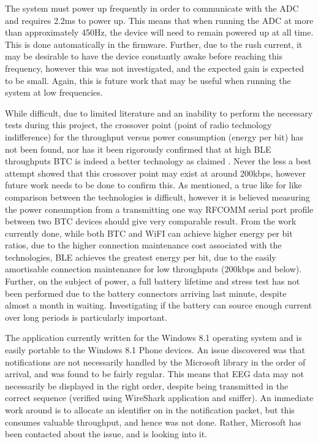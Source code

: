 \documentclass[]{article}
\begin{document}
 The system must power up frequently in order to communicate with the \ac{ADC} and requires 2.2ms to power up. This means that when running the \ac{ADC} at more than approximately 450Hz, the device will need to remain powered up at all time. This is done automatically in the firmware. Further, due to the rush current, it may be desirable to have the device constantly awake before reaching this frequency, however this was not investigated, and the expected gain is expected to be small. Again, this is future work that may be useful when running the system at low frequencies. 

While difficult, due to limited literature and an inability to perform the necessary tests during this project, the crossover point (point of radio technology indifference) for the throughput versus power consumption (energy per bit) has not been found, nor has it been rigorously confirmed that at high \ac{BLE} throughputs \ac{BTC} is indeed a better technology as claimed \cite{sig}. Never the less a best attempt showed that this crossover point may exist at around 200kbps, however future work needs to be done to confirm this. As mentioned, a true like for like comparison between the technologies is difficult, however it is believed measuring the power consumption from a transmitting one way RFCOMM serial port profile between two \ac{BTC} devices should give very comparable result. From the work currently done, while both \ac{BTC} and WiFI can achieve higher energy per bit ratios, due to the higher connection maintenance cost associated with the technologies, \ac{BLE} achieves the greatest energy per bit, due to the easily amortisable connection maintenance for low throughputs (200kbps and below). Further, on the subject of power, a full battery lifetime and stress test has not been performed due to the battery connectors arriving last minute, despite almost a month in waiting. Investigating if the battery can source enough current over long periods is particularly important. 

The application currently written for the Windows 8.1 operating system and is easily portable to the Windows 8.1 Phone devices. An issue discovered was that notifications are not necessarily handled by the Microsoft library in the order of arrival, and was found to be fairly regular. This means that \ac{EEG} data may not necessarily be displayed in the right order, despite being transmitted in the correct sequence (verified using WireShark application and sniffer). An immediate work around is to allocate an identifier on in the notification packet, but this consumes valuable throughput, and hence was not done. Rather, Microsoft has been contacted about the issue, and is looking into it. 
\end{document}
